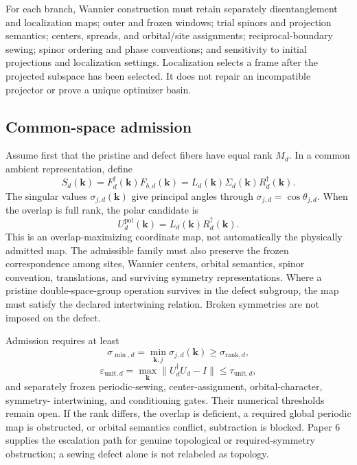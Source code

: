 \documentclass[11pt]{article}
\newenvironment{prospective}{\color{prospectivered}}{}
\begin{document}
\begin{prospective}
For each branch, Wannier construction must retain separately disentanglement and
localization maps; outer and frozen windows; trial spinors and projection semantics;
centers, spreads, and orbital/site assignments; reciprocal-boundary sewing; spinor
ordering and phase conventions; and sensitivity to initial projections and localization
settings. Localization selects a frame after the projected subspace has been selected.
It does not repair an incompatible projector or prove a unique optimizer basin.

\subsection{Common-space admission}
Assume first that the pristine and defect fibers have equal rank $M_d$. In a common
ambient representation, define
\begin{equation}
 S_d(\mathbf k)=F_d^\dagger(\mathbf k)F_{b,d}(\mathbf k)
 =L_d(\mathbf k)\Sigma_d(\mathbf k)R_d^\dagger(\mathbf k).
\end{equation}
The singular values $\sigma_{j,d}(\mathbf k)$ give principal angles through
$\sigma_{j,d}=\cos\theta_{j,d}$. When the overlap is full rank, the polar candidate is
\begin{equation}
 U_d^{\mathrm{pol}}(\mathbf k)=L_d(\mathbf k)R_d^\dagger(\mathbf k).
\end{equation}
This is an overlap-maximizing coordinate map, not automatically the physically admitted
map. The admissible family must also preserve the frozen correspondence among sites,
Wannier centers, orbital semantics, spinor convention, translations, and surviving
symmetry representations. Where a pristine double-space-group operation survives in the
defect subgroup, the map must satisfy the declared intertwining relation. Broken
symmetries are not imposed on the defect.

Admission requires at least
\begin{equation}
 \sigma_{\min,d}=\min_{\mathbf k,j}\sigma_{j,d}(\mathbf k)
 \ge \sigma_{\mathrm{rank},d},
\end{equation}
\begin{equation}
 \varepsilon_{\mathrm{unit},d}
 =\max_{\mathbf k}\lVert U_d^\dagger U_d-I\rVert
 \le\tau_{\mathrm{unit},d},
\end{equation}
and separately frozen periodic-sewing, center-assignment, orbital-character, symmetry-
intertwining, and conditioning gates. Their numerical thresholds remain open. If the
rank differs, the overlap is deficient, a required global periodic map is obstructed, or
orbital semantics conflict, subtraction is blocked. Paper 6 supplies the escalation path
for genuine topological or required-symmetry obstruction; a sewing defect alone is not
relabeled as topology.


\end{prospective}
\end{document}
